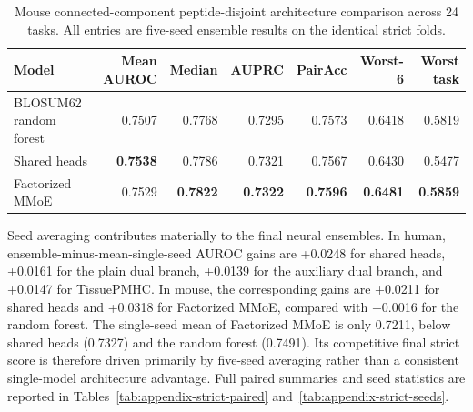 \begin{table}[tbp]
\centering
\caption{Mouse connected-component peptide-disjoint architecture comparison across 24 tasks. All entries are five-seed ensemble results on the identical strict folds.}
\label{tab:mouse-strict-architectures}
\scriptsize
\setlength{\tabcolsep}{1pt}
\begin{tabular}{lrrrrrr}
\toprule
Model & Mean AUROC & Median & AUPRC & PairAcc & Worst-6 & Worst task \\
\midrule
BLOSUM62 random forest & 0.7507 & 0.7768 & 0.7295 & 0.7573 & 0.6418 & 0.5819 \\
Shared heads & \textbf{0.7538} & 0.7786 & 0.7321 & 0.7567 & 0.6430 & 0.5477 \\
Factorized MMoE & 0.7529 & \textbf{0.7822} & \textbf{0.7322} & \textbf{0.7596} & \textbf{0.6481} & \textbf{0.5859} \\
\bottomrule
\end{tabular}
\end{table}

Seed averaging contributes materially to the final neural ensembles. In human, ensemble-minus-mean-single-seed AUROC gains are +0.0248 for shared heads, +0.0161 for the plain dual branch, +0.0139 for the auxiliary dual branch, and +0.0147 for TissuePMHC. In mouse, the corresponding gains are +0.0211 for shared heads and +0.0318 for Factorized MMoE, compared with +0.0016 for the random forest. The single-seed mean of Factorized MMoE is only 0.7211, below shared heads (0.7327) and the random forest (0.7491). Its competitive final strict score is therefore driven primarily by five-seed averaging rather than a consistent single-model architecture advantage. Full paired summaries and seed statistics are reported in Tables~\ref{tab:appendix-strict-paired} and~\ref{tab:appendix-strict-seeds}.
